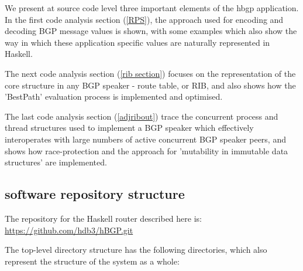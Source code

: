 \bigskip

We present at source code level three important elements of the hbgp application.  In the first code analysis section (\ref{RPS}), the approach used for encoding and decoding BGP message values is shown, with some examples which also show the way in which these application specific values are naturally represented in Haskell.

The next code analysis section (\ref{rib section}) focuses on the representation of the core structure in any BGP speaker - route table, or RIB, and also shows how the 'BestPath' evaluation process is implemented and optimised.

The last code analysis section (\ref{adjribout}) trace the concurrent process and thread structures used to implement a BGP speaker which effectively interoperates with large numbers of active concurrent BGP speaker peers, and shows how race-protection and the approach  for 'mutability in immutable data structures' are implemented.

\subsection{software repository structure}

The repository for the Haskell router described here is: \url{https://github.com/hdb3/hBGP.git}

The top-level directory structure has the following directories, which also represent the structure of the system as a whole:

